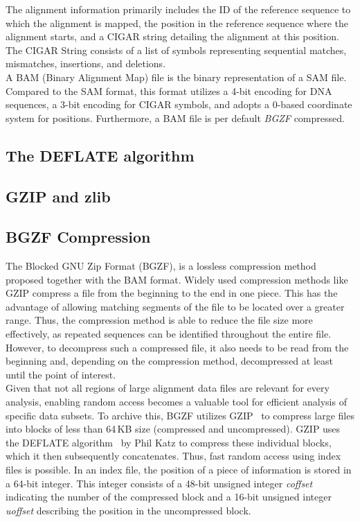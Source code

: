 The alignment information primarily includes the ID of the reference sequence to which the alignment is mapped, the position in the reference sequence where the alignment starts, and a CIGAR string detailing the alignment at this position. The CIGAR String consists of a list of symbols representing sequential matches, mismatches, insertions, and deletions. \\

A BAM (Binary Alignment Map) file is the binary representation of a SAM file. Compared to the SAM format, this format utilizes a 4-bit encoding for DNA sequences, a 3-bit encoding for CIGAR symbols, and adopts a 0-based coordinate system for positions. Furthermore, a BAM file is per default \textit{BGZF} compressed.

\subsection{The DEFLATE algorithm}

\subsection{GZIP and zlib}

\subsection{BGZF Compression} \label{bgzf}
The Blocked GNU Zip Format (BGZF), is a lossless compression method proposed together with the BAM format. Widely used compression methods like GZIP compress a file from the beginning to the end in one piece. This has the advantage of allowing matching segments of the file to be located over a greater range. Thus, the compression method is able to reduce the file size more effectively, as repeated sequences can be identified throughout the entire file. However, to decompress such a compressed file, it also needs to be read from the beginning and, depending on the compression method, decompressed at least until the point of interest. \\

Given that not all regions of large alignment data files are relevant for every analysis, enabling random access becomes a valuable tool for efficient analysis of specific data subsets. To archive this, BGZF utilizes GZIP~\cite{gzip} to compress large files into blocks of less than 64\,KB size (compressed and uncompressed). GZIP uses the DEFLATE algorithm~\cite{deflate} by Phil Katz to compress these individual blocks, which it then subsequently concatenates. Thus, fast random access using index files is possible. In an index file, the position of a piece of information is stored in a 64-bit integer. This integer consists of a 48-bit unsigned integer \textit{coffset} indicating the number of the compressed block and a 16-bit unsigned integer \textit{uoffset} describing the position in the uncompressed block. \\

